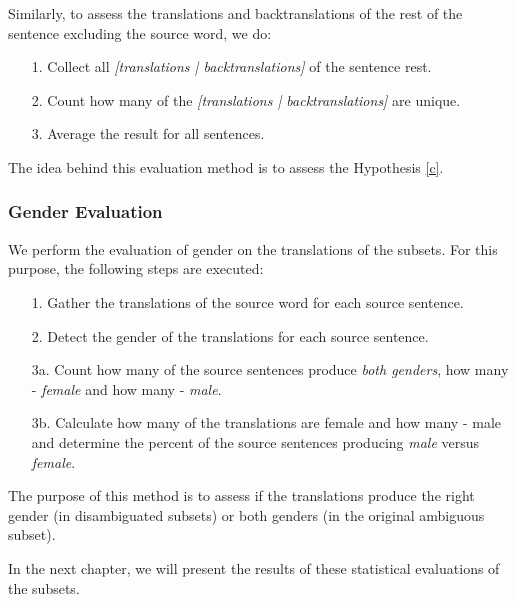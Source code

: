 Similarly, to assess the translations and backtranslations of the rest of the sentence excluding the source word, we do:
\begin{enumerate}
    \item[1. ] Collect all \textit{[translations | backtranslations]} of the sentence rest.
    \item[2. ] Count how many of the \textit{[translations | backtranslations]} are unique.
    \item[3. ] Average the result for all sentences.
\end{enumerate}

The idea behind this evaluation method is to assess the Hypothesis \ref{c}.

\subsubsection{Gender Evaluation}
\label{sec:Experiments:Statistics:Gender}
We perform the evaluation of gender on the translations of the subsets.  For this purpose, the following steps are executed:

\begin{enumerate}
    \item[1. ] Gather the translations of the source word for each source sentence.
    \item[2. ] Detect the gender of the translations for each source sentence.
    \item[3a. ] Count how many of the source sentences produce \textit{both genders}, how many - \textit{female} and how many - \textit{male}. 
    \item[3b. ] Calculate how many of the translations are female and how many - male and determine the percent of the source sentences producing \textit{male} versus \textit{female}. 
\end{enumerate}

The purpose of this method is to assess if the translations produce the right gender (in disambiguated subsets) or both genders (in the original ambiguous subset).

In the next chapter, we will present the results of these statistical evaluations of the subsets.


